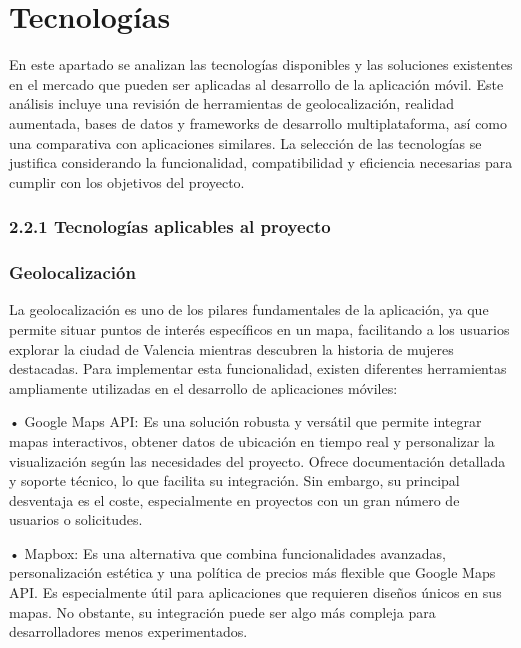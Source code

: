 \section{Tecnologías}
En este apartado se analizan las tecnologías disponibles y las soluciones existentes en el mercado que pueden ser aplicadas al desarrollo de la aplicación móvil. Este análisis incluye una revisión de herramientas de geolocalización, realidad aumentada, bases de datos y frameworks de desarrollo multiplataforma, así como una comparativa con aplicaciones similares. La selección de las tecnologías se justifica considerando la funcionalidad, compatibilidad y eficiencia necesarias para cumplir con los objetivos del proyecto.

\subsubsection{2.2.1 Tecnologías aplicables al proyecto}

\subsubsection{Geolocalización}


La geolocalización es uno de los pilares fundamentales de la aplicación, ya que permite situar puntos de interés específicos en un mapa, facilitando a los usuarios explorar la ciudad de Valencia mientras descubren la historia de mujeres destacadas. Para implementar esta funcionalidad, existen diferentes herramientas ampliamente utilizadas en el desarrollo de aplicaciones móviles:

	•	Google Maps API: Es una solución robusta y versátil que permite integrar mapas interactivos, obtener datos de ubicación en tiempo real y personalizar la visualización según las necesidades del proyecto. Ofrece documentación detallada y soporte técnico, lo que facilita su integración. Sin embargo, su principal desventaja es el coste, especialmente en proyectos con un gran número de usuarios o solicitudes.
    
	•	Mapbox: Es una alternativa que combina funcionalidades avanzadas, personalización estética y una política de precios más flexible que Google Maps API. Es especialmente útil para aplicaciones que requieren diseños únicos en sus mapas. No obstante, su integración puede ser algo más compleja para desarrolladores menos experimentados.
    
